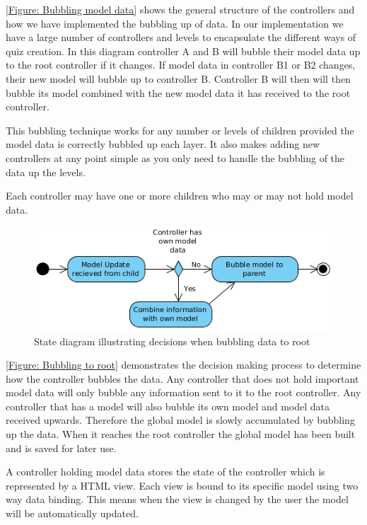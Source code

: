 \autoref{Figure: Bubbling model data} shows the general structure of the controllers and how we have implemented the bubbling up of data. In our implementation we have a large number of controllers and levels to encapsulate the different ways of quiz creation. In this diagram controller A and B will bubble their model data up to the root controller if it changes. If model data in controller B1 or B2 changes, their new model will bubble up to controller B. Controller B will then will then bubble its model combined with the new model data it has received to the root controller.

This bubbling technique works for any number or levels of children provided the model data is correctly bubbled up each layer. It also makes adding new controllers at any point simple as you only need to handle the bubbling of the data up the levels.

Each controller may have one or more children who may or may not hold model data.

\begin{figure}[h]
	\centering
		\includegraphics[scale=0.6]{../figures/authoring_tool/bubbling_to_root.png} 		
	\caption{\label{Figure: Bubbling to root} State diagram illustrating decisions when bubbling data to root} 	
\end{figure}

\autoref{Figure: Bubbling to root} demonstrates the decision making process to determine how the controller bubbles the data. Any controller that does not hold important model data will only bubble any information sent to it to the root controller. Any controller that has a model will also bubble its own model and model data received upwards. Therefore the global model is slowly accumulated by bubbling up the data. When it reaches the root controller the global model has been built and is saved for later use.

A controller holding model data stores the state of the controller which is represented by a HTML view. Each view is bound to its specific model using two way data binding. This means when the view is changed by the user the model will be automatically updated.

